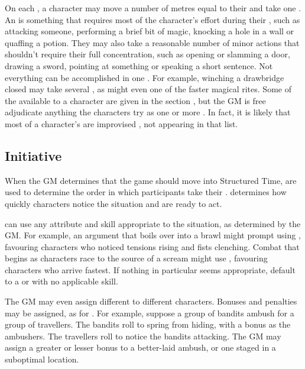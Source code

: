 On each {\turn}, a character may move a number of metres equal to their  and take one {\action}.
An {\action} is something that requires most of the character's effort during their {\turn}, such as attacking someone, performing a brief bit of magic, knocking a hole in a wall or quaffing a potion.
They may also take a reasonable number of minor actions that shouldn't require their full concentration, such as opening or slamming a door, drawing a sword, pointing at something or speaking a short sentence.
Not everything can be accomplished in one {\action}.
For example, winching a drawbridge closed may take several {\actions}, as might even one of the faster magical rites.
Some of the {\actions} available to a character are given in the section , but the GM is free adjudicate anything the characters try as one or more {\actions}.
In fact, it is likely that most of a character's {\actions} are improvised {\actions}, not appearing in that list.

\subsection{Initiative}

When the GM determines that the game should move into Structured Time, {\initiative} {\tests} are used to determine the order in which participants take their {\turns}.
{\initiative} determines how quickly characters notice the situation and are ready to act.

\capital{\initiative} {\tests} can use any attribute and skill appropriate to the situation, as determined by the GM.
For example, an argument that boils over into a brawl might prompt {\initiative} {\tests} using , favouring characters who noticed tensions rising and fists clenching.
Combat that begins as characters race to the source of a scream might use , favouring characters who arrive fastest.
If nothing in particular seems appropriate, default to a  or  {\test} with no applicable skill.

The GM may even assign different {\tests} to different characters.
Bonuses and penalties may be assigned, as for {\opposedtests}.
For example, suppose a group of bandits ambush for a group of travellers.
The bandits roll  to spring from hiding, with a  bonus as the ambushers.
The travellers roll  to notice the bandits attacking.
The GM may assign a greater or lesser bonus to a better-laid ambush, or one staged in a suboptimal location.

